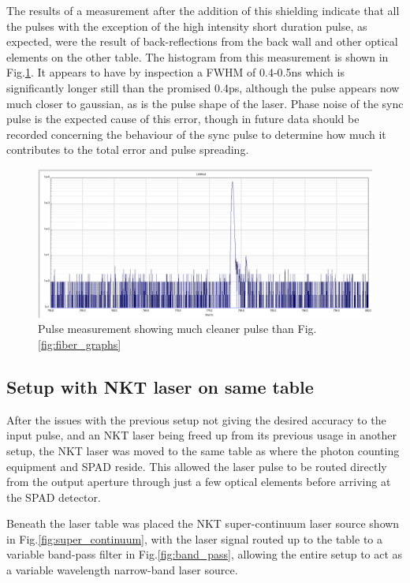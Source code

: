 \documentclass[a4paper]{article}
\begin{document}
The results of a measurement after the addition of this shielding indicate that all the pulses with the exception of the high intensity short duration pulse, as expected, were the result of back-reflections from the back wall and other optical elements on the other table. The histogram from this measurement is shown in Fig.\ref{fig:fiber_output_shielded}. It appears to have by inspection a FWHM of 0.4-0.5ns which is significantly longer still than the promised 0.4ps, although the pulse appears now much closer to gaussian, as is the pulse shape of the laser. Phase noise of the sync pulse is the expected cause of this error, though in future data should be recorded concerning the behaviour of the sync pulse to determine how much it contributes to the total error and pulse spreading.

\begin{figure}
\centering
\includegraphics[width=1.0\textwidth]{figures/pulse_clear.PNG}
\caption{\label{fig:fiber_output_shielded}Pulse measurement showing much cleaner pulse than Fig.\ref{fig:fiber_graphs}}
\end{figure}

\subsection{Setup with NKT laser on same table}

After the issues with the previous setup not giving the desired accuracy to the input pulse, and an NKT laser being freed up from its previous usage in another setup, the NKT laser was moved to the same table as where the photon counting equipment and SPAD reside. This allowed the laser pulse to be routed directly from the output aperture through just a few optical elements before arriving at the SPAD detector.

Beneath the laser table was placed the NKT super-continuum laser source shown in Fig.\ref{fig:super_continuum}, with the laser signal routed up to the table to a variable band-pass filter in Fig.\ref{fig:band_pass}, allowing the entire setup to act as a variable wavelength narrow-band laser source.
\end{document}
